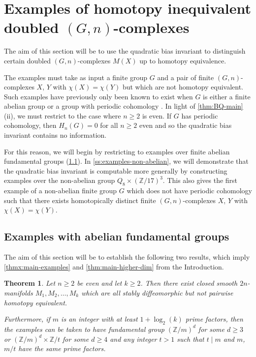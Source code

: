 \documentclass[11pt,a4paper,leqno]{amsart}
\newtheorem{theorem}{Theorem}[section]
\theoremstyle{definition}
\theoremstyle{remark}
\newcommand{\Z}{\mathbb{Z}}
\begin{document}
\section{Examples of homotopy inequivalent doubled $(G,n)$-complexes}
\label{s:examples-manifolds}

The aim of this section will be to use the quadratic bias invariant to distinguish certain doubled $(G,n)$-complexes $M(X)$ up to homotopy equivalence. 

The examples must take as input a finite group $G$ and a pair of finite $(G,n)$-complexes $X$, $Y$ with $\chi(X)=\chi(Y)$ but which are not homotopy equivalent. Such examples have previously only been known to exist when $G$ is either a finite abelian group \cite{Metzler:1976,Sieradski:1979} or a group with periodic cohomology \cite{Dy76,Ni20-II,Ni21}. 
In light of \cref{thm:BQ-main} (ii), we must restrict to the case where $n \ge 2$ is even.
If $G$ has periodic cohomology, then $H_n(G)=0$ for all $n \ge 2$ even \cite[Corollary 2]{Sw71} and so the quadratic bias invariant contains no information.

For this reason, we will begin by restricting to examples over finite abelian fundamental groups (\cref{ss:examples-abelian}). In \cref{ss:examples-non-abelian}, we will demonstrate that the quadratic bias invariant is computable more generally by constructing examples over the non-abelian group $Q_8 \times (\Z/17)^3$. This also gives the first example of a non-abelian finite group $G$ which does not have periodic cohomology such that there exists homotopically distinct finite $(G,n)$-complexes $X$, $Y$ with $\chi(X)=\chi(Y)$.

\subsection{Examples with abelian fundamental groups} \label{ss:examples-abelian}

The aim of this section will be to establish the following two results, which imply \cref{thmx:main-examples} and \cref{thm:main-higher-dim} from the Introduction.

\begin{theorem} \label{thm:final-examples}
Let $n \geq 2$ be even and let $k \geq 2$.  Then there exist closed smooth $2n$-manifolds $M_1, M_2, \dots, M_k$ which are all stably diffeomorphic but not pairwise homotopy equivalent. 

Furthermore, if $m$ is an integer with at least $1+\log_2(k)$ prime factors, then the examples can be taken to have fundamental group $(\Z/m)^d$ for some $d \ge 3$ or $(\Z/m)^{d} \times \Z/t$ for some $d \ge 4$ and any integer $t > 1$ such that $t \mid m$ and $m$, $m/t$ have the same prime factors.
\end{theorem}
\end{document}
